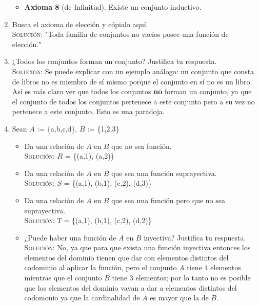 \documentclass[letterpaper,11pt]{article}
\begin{document}
\begin{enumerate}
\begin{itemize}
            \item \textbf{Axioma 8} (de Infinitud). Existe un conjunto
            inductivo.
        
        \end{itemize}
        
        \item Busca el axioma de elección y cópialo aquí. \\ 
        \textsc{Solución:} "Toda familia de conjuntos no vacíos posee una
        función de elección."
        
        \item ¿Todos los conjuntos forman un conjunto? Justifica tu respuesta.\\
        \textsc{Solución:} Se puede explicar con un ejemplo análogo: un
        conjunto que consta de libros no es miembro de sí mismo porque el
        conjunto en sí no es un libro. Así es más claro ver que todos los
        conjuntos \textbf{no} forman un conjunto, ya que el conjunto de todos
        los conjuntos pertenece a este conjunto pero a su vez no pertenece a
        este conjunto. Esto es una paradoja.
        
        \item Sean $A$ := \{a,b,c,d\}, $B$ := \{1,2,3\}
        
        \begin{itemize}
            
            \item Da una relación de $A$ en $B$ que no sea función. \\
            \textsc{Solución:} $R$ = \{(a,1), (a,2)\}
            
            \item Da una relación de $A$ en $B$ que sea una función
            suprayectiva. \\ 
            \textsc{Solución:} $S$ = \{(a,1), (b,1), (c,2), (d,3)\}
            
            \item Da una relación de $A$ en $B$ que sea una función pero que no
            sea suprayectiva. \\ 
            \textsc{Solución:} $T$ = \{(a,1), (b,1), (c,2), (d,2)\} 
            
            \item ¿Puede haber una función de $A$ en $B$ inyectiva? Justifica
            tu respuesta. \\
            \textsc{Solución:} No, ya que para que exista una función inyectiva
            entonces los elementos del dominio tienen que dar con elementos
            distintos del codominio al aplicar la función, pero el conjunto $A$
            tiene 4 elementos mientras que el conjunto $B$ tiene 3 elementos;
            por lo tanto no es posible que los elementos del dominio vayan a 
            dar a elementos distintos del codomonio ya que la cardinalidad de 
            $A$ es mayor que la de $B$.
            

\end{itemize}
\end{enumerate}
\end{document}
